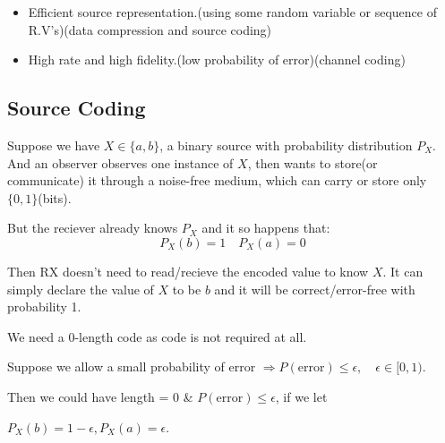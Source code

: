 \documentclass{article}
\begin{document}
\begin{itemize}
    \item Efficient source representation.(using some random variable or sequence of R.V's)(data compression and source coding)
    \item High rate and high fidelity.(low probability of error)(channel coding)
\end{itemize}

\subsection{Source Coding}

Suppose we have $X \in \{ a,b\}$, a binary source with probability distribution $P_X$. And an observer observes one instance of $X$, then wants to store(or communicate) it through a noise-free medium, which can carry or store only $\{ 0,1 \}$(bits).

But the reciever already knows $P_X$ and it so happens that:
$$ P_X(b)=1 \quad P_X(a)=0$$

Then RX doesn't need to read/recieve the encoded value to know $X$. It can simply declare the value of $X$ to be $b$ and it will be correct/error-free with probability 1.

We need a 0-length code as code is not required at all.

Suppose we allow a small probability of error $\Rightarrow P(\text{error}) \leq \epsilon, \quad \epsilon \in [0,1)$.

Then we could have length = 0 \& $P(\text{error}) \leq \epsilon$, if we let

$ P_X(b)=1-\epsilon, P_X(a)=\epsilon $.
\end{document}
